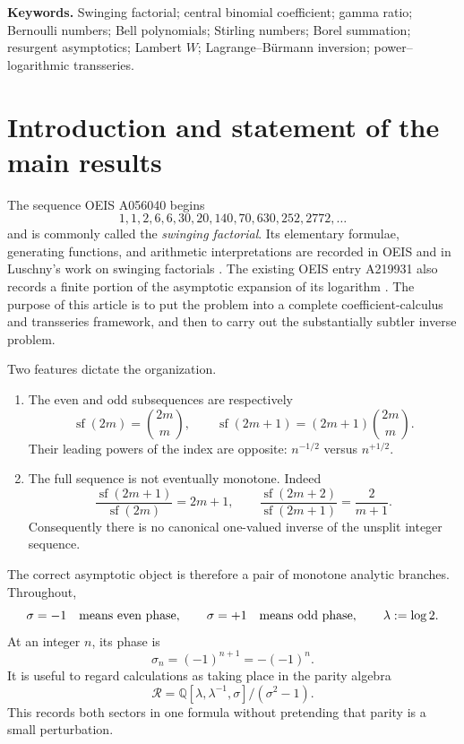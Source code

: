 \documentclass[11pt,a4paper]{article}
\numberwithin{equation}{section}
\theoremstyle{definition}
\theoremstyle{remark}
\newcommand{\SF}{\operatorname{sf}}
\begin{document}
\begin{center}
\small\textbf{Keywords.}
Swinging factorial; central binomial coefficient; gamma ratio; Bernoulli
numbers; Bell polynomials; Stirling numbers; Borel summation; resurgent
asymptotics; Lambert \(W\); Lagrange--B\"urmann inversion; power--logarithmic
transseries.
\end{center}

\tableofcontents

\section{Introduction and statement of the main results}

The sequence OEIS A056040 begins
\[
 1,1,2,6,6,30,20,140,70,630,252,2772,\ldots
\]
and is commonly called the \emph{swinging factorial}.  Its elementary
formulae, generating functions, and arithmetic interpretations are recorded
in OEIS and in Luschny's work on swinging factorials
\cite{OEISA056040,LuschnySwing}.  The existing OEIS entry A219931 also
records a finite portion of the asymptotic expansion of its logarithm
\cite{OEISA219931}.  The purpose of this article is to put the problem into a
complete coefficient-calculus and transseries framework, and then to carry
out the substantially subtler inverse problem.

Two features dictate the organization.

\begin{enumerate}
\item The even and odd subsequences are respectively
\[
 \SF(2m)=\binom{2m}{m},\qquad
 \SF(2m+1)=(2m+1)\binom{2m}{m}.
\]
Their leading powers of the index are opposite: \(n^{-1/2}\) versus
\(n^{+1/2}\).
\item The full sequence is not eventually monotone.  Indeed
\[
 \frac{\SF(2m+1)}{\SF(2m)}=2m+1,
 \qquad
 \frac{\SF(2m+2)}{\SF(2m+1)}=\frac{2}{m+1}.
\]
Consequently there is no canonical one-valued inverse of the unsplit integer
sequence.
\end{enumerate}

The correct asymptotic object is therefore a pair of monotone analytic
branches.  Throughout,
\[
 \sigma=-1\quad\hbox{means even phase},\qquad
 \sigma=+1\quad\hbox{means odd phase},
 \qquad \lambda:=\log2.
\]
At an integer \(n\), its phase is
\[
 \sigma_n=(-1)^{n+1}=-(-1)^n.
\]
It is useful to regard calculations as taking place in the parity algebra
\[
 \mathscr R=\mathbb Q[\lambda,\lambda^{-1},\sigma]/(\sigma^2-1).
\]
This records both sectors in one formula without pretending that parity is a
small perturbation.
\end{document}
